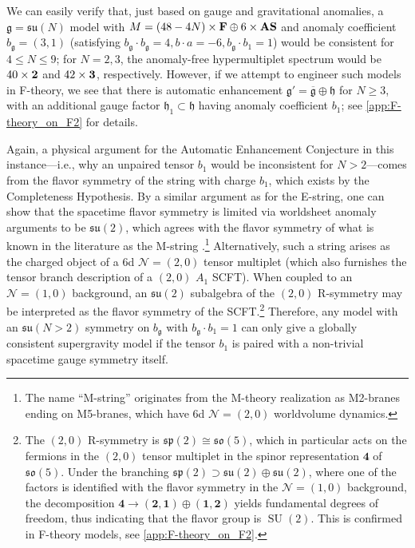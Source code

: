 \documentclass[11pt, a4paper]{article}
\newcommand*{\cN}{\ensuremath{\mathcal{N}}}
\newcommand*{\fkg}{\ensuremath{\mathfrak{g}}}
\newcommand*{\fkh}{\ensuremath{\mathfrak{h}}}
\DeclareMathOperator{\SU}{SU}
\newcommand*{\fksu}{\ensuremath{\mathfrak{su}}}
\newcommand*{\fkso}{\ensuremath{\mathfrak{so}}}
\newcommand*{\fksp}{\ensuremath{\mathfrak{sp}}}
\begin{document}
We can easily verify that, just based on gauge and gravitational anomalies, a $\fkg = \fksu(N)$ model with $M = (48-4N) \times {\bf F} \oplus 6 \times {\bf AS}$ and anomaly coefficient $b_\fkg = (3,1)$ (satisfying $b_\fkg \cdot b_\fkg = 4, b \cdot a = -6, b_\fkg \cdot b_1 =1$) would be consistent for $4 \le N \le 9$; for $N=2,3$, the anomaly-free hypermultiplet spectrum would be $40 \times {\bf 2}$ and $42 \times {\bf 3}$, respectively.
However, if we attempt to engineer such models in F-theory, we see that there is automatic enhancement $\fkg' = \overline{\fkg} \oplus \fkh$ for $N \ge 3$, with an additional gauge factor $\fkh_1 \subset \fkh$ having anomaly coefficient $b_1$; see \cref{app:F-theory_on_F2} for details.

Again, a physical argument for the Automatic Enhancement Conjecture in this instance---i.e., why an unpaired tensor $b_1$ would be inconsistent for $N>2$---comes from the flavor symmetry of the string with charge $b_1$, which exists by the Completeness Hypothesis.
By a similar argument as for the E-string, one can show that the spacetime flavor symmetry is limited via worldsheet anomaly arguments to be $\fksu(2)$, which agrees with the flavor symmetry of what is known in the literature as the M-string \cite{Haghighat:2013gba}.\footnote{The name ``M-string'' originates from the M-theory realization as M2-branes ending on M5-branes, which have 6d $\cN=(2,0)$ worldvolume dynamics.}
Alternatively, such a string arises as the charged object of a 6d $\cN=(2,0)$ tensor multiplet (which also furnishes the tensor branch description of a $(2,0)$ $A_1$ SCFT).
When coupled to an $\cN = (1,0)$ background, an $\fksu(2)$ subalgebra of the $(2,0)$ R-symmetry may be interpreted as the flavor symmetry of the SCFT.\footnote{The $(2,0)$ R-symmetry is $\fksp(2) \cong \fkso(5)$, which in particular acts on the fermions in the $(2,0)$ tensor multiplet in the spinor representation $\bm{4}$ of $\fkso(5)$.
Under the branching $\fksp(2) \supset \fksu(2) \oplus \fksu(2)$, where one of the factors is identified with the flavor symmetry in the $\cN=(1,0)$ background, the decomposition $\bm{4} \rightarrow (\bm{2}, \bm{1}) \oplus (\bm{1}, \bm{2})$ yields fundamental degrees of freedom, thus indicating that the flavor group is $\SU(2)$.
This is confirmed in F-theory models, see \cref{app:F-theory_on_F2}.}
Therefore, any model with an $\fksu(N>2)$ symmetry on $b_\fkg$ with $b_\fkg \cdot b_1 =1$ can only give a globally consistent supergravity model if the tensor $b_1$ is paired with a non-trivial spacetime gauge symmetry itself.
\end{document}
